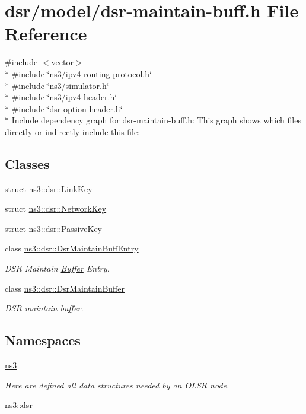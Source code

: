 \hypertarget{dsr-maintain-buff_8h}{}\section{dsr/model/dsr-\/maintain-\/buff.h File Reference}
\label{dsr-maintain-buff_8h}
{\ttfamily \#include $<$vector$>$}\\*
{\ttfamily \#include \char`\"{}ns3/ipv4-\/routing-\/protocol.\+h\char`\"{}}\\*
{\ttfamily \#include \char`\"{}ns3/simulator.\+h\char`\"{}}\\*
{\ttfamily \#include \char`\"{}ns3/ipv4-\/header.\+h\char`\"{}}\\*
{\ttfamily \#include \char`\"{}dsr-\/option-\/header.\+h\char`\"{}}\\*
Include dependency graph for dsr-\/maintain-\/buff.h\+:
This graph shows which files directly or indirectly include this file\+:
\subsection*{Classes}
\begin{DoxyCompactItemize}
\item 
struct \hyperlink{structns3_1_1dsr_1_1LinkKey}{ns3\+::dsr\+::\+Link\+Key}
\item 
struct \hyperlink{structns3_1_1dsr_1_1NetworkKey}{ns3\+::dsr\+::\+Network\+Key}
\item 
struct \hyperlink{structns3_1_1dsr_1_1PassiveKey}{ns3\+::dsr\+::\+Passive\+Key}
\item 
class \hyperlink{classns3_1_1dsr_1_1DsrMaintainBuffEntry}{ns3\+::dsr\+::\+Dsr\+Maintain\+Buff\+Entry}
\begin{DoxyCompactList}\small\item\em D\+SR Maintain \hyperlink{classns3_1_1Buffer}{Buffer} Entry. \end{DoxyCompactList}\item 
class \hyperlink{classns3_1_1dsr_1_1DsrMaintainBuffer}{ns3\+::dsr\+::\+Dsr\+Maintain\+Buffer}
\begin{DoxyCompactList}\small\item\em D\+SR maintain buffer. \end{DoxyCompactList}\end{DoxyCompactItemize}
\subsection*{Namespaces}
\begin{DoxyCompactItemize}
\item 
 \hyperlink{namespacens3}{ns3}
\begin{DoxyCompactList}\small\item\em Here are defined all data structures needed by an O\+L\+SR node. \end{DoxyCompactList}\item 
 \hyperlink{namespacens3_1_1dsr}{ns3\+::dsr}
\end{DoxyCompactItemize}
